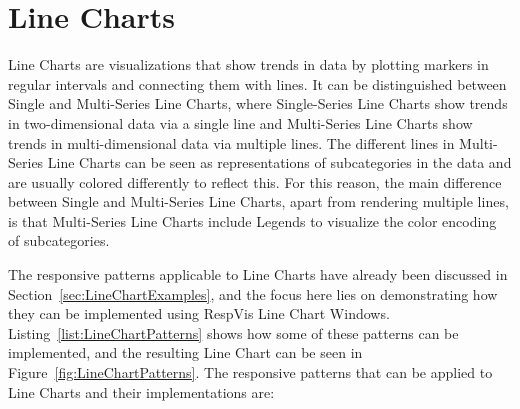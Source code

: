 \section{Line Charts}
\label{sec:LineChartsUsage}

Line Charts are visualizations that show trends in data by plotting markers in regular intervals and connecting them with lines.
It can be distinguished between Single and Multi-Series Line Charts, where Single-Series Line Charts show trends in two-dimensional data via a single line and Multi-Series Line Charts show trends in multi-dimensional data via multiple lines. 
The different lines in Multi-Series Line Charts can be seen as representations of subcategories in the data and are usually colored differently to reflect this.
For this reason, the main difference between Single and Multi-Series Line Charts, apart from rendering multiple lines, is that Multi-Series Line Charts include Legends to visualize the color encoding of subcategories.

The responsive patterns applicable to Line Charts have already been discussed in Section~\ref{sec:LineChartExamples}, and the focus here lies on demonstrating how they can be implemented using RespVis Line Chart Windows. 
Listing~\ref{list:LineChartPatterns} shows how some of these patterns can be implemented, and the resulting Line Chart can be seen in Figure~\ref{fig:LineChartPatterns}.
The responsive patterns that can be applied to Line Charts and their implementations are:

